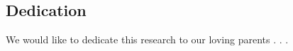 \begin{center}
    \section*{Dedication}
\end{center}
We would like to dedicate this research to our loving parents . . .